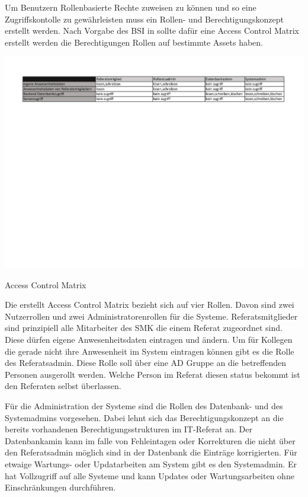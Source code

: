 Um Benutzern Rollenbasierte Rechte zuweisen zu können und so eine Zugriffskontolle zu gewährleisten muss ein Rollen- und Berechtigungskonzept erstellt werden. Nach Vorgabe des BSI in \cite[KOP3]{BSIWeb} sollte dafür eine Access Control Matrix erstellt werden die Berechtigungen Rollen
auf bestimmte Assets haben.

\begin{table}[htbp]
    \centering
    \includegraphics[width=1\textwidth,angle=0]{abb/Berechtigungsmatrix.pdf}
    \caption[Beschreibung]{Access Control Matrix}
    \label{abb:AccessControlMatrix}
\end{table}

Die erstellt Access Control Matrix bezieht sich auf vier Rollen. Davon sind zwei Nutzerrollen und zwei Administratorenrollen für die Systeme. Referatsmitglieder sind prinzipiell alle Mitarbeiter des SMK die einem Referat zugeordnet sind. Diese dürfen eigene Anwesenheitsdaten eintragen und \ggfs ändern. Um für Kollegen die gerade nicht ihre Anwesenheit im System eintragen können gibt es die Rolle des Referatsadmin. Diese Rolle soll über eine AD Gruppe an die betreffenden Personen ausgerollt werden. Welche Person im Referat diesen status bekommt ist den Referaten selbst überlassen.

Für die Administration der Systeme sind die Rollen des Datenbank- und des Systemadmins vorgesehen. Dabei lehnt sich das Berechtigungskonzept an die bereits vorhandenen Berechtigungsstrukturen im IT-Referat an. Der Datenbankamin kann im falle von Fehleintagen oder Korrekturen die nicht über den Referatsadmin möglich sind in der Datenbank die Einträge korrigierten. Für etwaige Wartungs- oder Updatarbeiten am System gibt es den Systemadmin. Er hat Vollzugriff auf alle Systeme und kann Updates oder Wartungsarbeiten ohne Einschränkungen durchführen.



